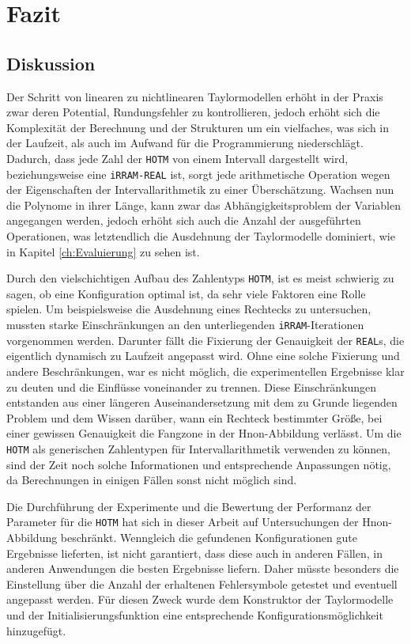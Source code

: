 
\chapter{Fazit}
\label{ch:fazit}

\section{Diskussion}
Der Schritt von linearen zu nichtlinearen Taylormodellen erhöht in der Praxis zwar deren Potential, Rundungsfehler zu kontrollieren, jedoch erhöht sich die Komplexität der Berechnung und der Strukturen um ein vielfaches, was sich in der Laufzeit, als auch im Aufwand für die Programmierung niederschlägt. Dadurch, dass jede Zahl der \verb+HOTM+ von einem Intervall dargestellt wird, beziehungsweise eine \verb+iRRAM-REAL+ ist, sorgt jede arithmetische Operation wegen der Eigenschaften der Intervallarithmetik zu einer Überschätzung. Wachsen nun die Polynome in ihrer Länge, kann zwar das Abhängigkeitsproblem der Variablen angegangen werden, jedoch erhöht sich auch die Anzahl der ausgeführten Operationen, was letztendlich die Ausdehnung der Taylormodelle dominiert, wie in Kapitel \ref{ch:Evaluierung} zu sehen ist. 

Durch den vielschichtigen Aufbau des Zahlentyps \verb+HOTM+, ist es meist schwierig zu sagen, ob eine Konfiguration optimal ist, da sehr viele Faktoren eine Rolle spielen. Um beispielsweise die Ausdehnung eines Rechtecks zu untersuchen, mussten starke Einschränkungen an den unterliegenden \verb+iRRAM+-Iterationen vorgenommen werden. Darunter fällt die Fixierung der Genauigkeit der \verb+REAL+s, die eigentlich dynamisch zu Laufzeit angepasst wird. Ohne eine solche Fixierung und andere Beschränkungen, war es nicht möglich, die experimentellen Ergebnisse klar zu deuten und die Einflüsse voneinander zu trennen. Diese Einschränkungen entstanden aus einer längeren Auseinandersetzung mit dem zu Grunde liegenden Problem und dem Wissen darüber, wann ein Rechteck bestimmter Größe, bei einer gewissen Genauigkeit die Fangzone in der H\e non-Abbildung verlässt. Um die \verb+HOTM+ als generischen Zahlentypen für Intervallarithmetik verwenden zu können, sind der Zeit noch solche Informationen und entsprechende Anpassungen nötig, da Berechnungen in einigen Fällen sonst nicht möglich sind.


Die Durchführung der Experimente und die Bewertung der Performanz der Parameter für die \verb+HOTM+ hat sich in dieser Arbeit auf Untersuchungen der H\e non-Abbildung beschränkt. Wenngleich die gefundenen Konfigurationen gute Ergebnisse lieferten, ist nicht garantiert, dass diese auch in anderen Fällen, in anderen Anwendungen die besten Ergebnisse liefern. Daher müsste besonders die Einstellung über die Anzahl der erhaltenen Fehlersymbole getestet und eventuell angepasst werden. Für diesen Zweck wurde dem Konstruktor der Taylormodelle und der Initialisierungsfunktion eine entsprechende Konfigurationsmöglichkeit hinzugefügt. 

